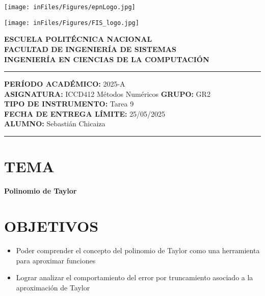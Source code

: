 \documentclass[12pt]{article}
\begin{document}
\begin{minipage}{0.45\textwidth}
    \texttt{[image: inFiles/Figures/epnLogo.jpg]}
\end{minipage}
\hfill
\begin{minipage}{0.45\textwidth}
    \raggedleft
    \texttt{[image: inFiles/Figures/FIS\_logo.jpg]}
\end{minipage}

\vspace{0.5cm}

\begin{center}
    \textbf{ESCUELA POLITÉCNICA NACIONAL}\\[0.2cm]
    \textbf{FACULTAD DE INGENIERÍA DE SISTEMAS}\\[0.2cm]
    \textbf{INGENIERÍA EN CIENCIAS DE LA COMPUTACIÓN}
\end{center}

\vspace{0.5cm}
\hrule
\vspace{0.5cm}

\noindent\textbf{PERÍODO ACADÉMICO:} 2025-A\\[0.2cm]
\noindent\textbf{ASIGNATURA:} ICCD412 Métodos Numéricos \hfill \textbf{GRUPO:} GR2\\[0.2cm]
\noindent\textbf{TIPO DE INSTRUMENTO:} Tarea 9\\[0.2cm]
\noindent\textbf{FECHA DE ENTREGA LÍMITE:} {25/05/2025}\\[0.2cm]
\noindent\textbf{ALUMNO:} {Sebastián Chicaiza}

\vspace{0.5cm}
\hrule
\vspace{1cm}


\section*{TEMA}

\begin{center}
    \Large\textbf{Polinomio de Taylor}
\end{center}
\vspace{0.5cm}

\section*{OBJETIVOS}
\begin{itemize}
    \item {Poder comprender el concepto del polinomio de Taylor como una herramienta para aproximar funciones}
    \item {Lograr analizar el comportamiento del error por truncamiento asociado a la aproximación de Taylor}
\end{itemize}
\vspace{0.5cm}
\end{document}
